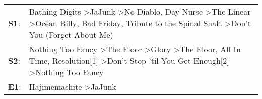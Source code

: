 \begin{supertabular}{p{0.03\textwidth}p{0.92\textwidth}}
 \textbf{S1}:  &  Bathing Digits\textsuperscript{} \textgreater \enspace JaJunk\textsuperscript{} \textgreater \enspace No Diablo\textsuperscript{}, \enspace Day Nurse\textsuperscript{} \textgreater \enspace The Linear\textsuperscript{} \textgreater \enspace Ocean Billy\textsuperscript{}, \enspace Bad Friday\textsuperscript{}, \enspace Tribute to the Spinal Shaft\textsuperscript{} \textgreater \enspace Don't You (Forget About Me)\textsuperscript{}  \enspace  \\
 \textbf{S2}:  &                                        Nothing Too Fancy\textsuperscript{} \textgreater \enspace The Floor\textsuperscript{} \textgreater \enspace Glory\textsuperscript{} \textgreater \enspace The Floor\textsuperscript{}, \enspace All In Time\textsuperscript{}, \enspace Resolution[1]\textsuperscript{} \textgreater \enspace Don't Stop 'til You Get Enough[2]\textsuperscript{} \textgreater \enspace Nothing Too Fancy\textsuperscript{}  \enspace  \\
 \textbf{E1}:  &                                                                                                                                                                                                                                                                                                                                                                     Hajimemashite\textsuperscript{} \textgreater \enspace JaJunk\textsuperscript{}  \enspace  \\
\end{supertabular}
